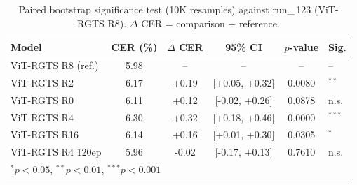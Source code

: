 \begin{table}[t]
\centering
\caption{Paired bootstrap significance test (10K resamples) against run\_{\,123} (ViT-RGTS R8). $\Delta$ CER = comparison $-$ reference.}
\label{tab:significance}
\begin{tabular}{lccccl}
\toprule
Model & CER (\%) & $\Delta$ CER & 95\% CI & $p$-value & Sig. \\
\midrule
ViT-RGTS R8 (ref.) & 5.98 & -- & -- & -- & -- \\
\midrule
ViT-RGTS R2 & 6.17 & +0.19 & [+0.05, +0.32] & 0.0080 & $^{**}$ \\
ViT-RGTS R0 & 6.11 & +0.12 & [-0.02, +0.26] & 0.0878 & n.s. \\
ViT-RGTS R4 & 6.30 & +0.32 & [+0.18, +0.46] & 0.0000 & $^{***}$ \\
ViT-RGTS R16 & 6.14 & +0.16 & [+0.01, +0.30] & 0.0305 & $^{*}$ \\
ViT-RGTS R4 120ep & 5.96 & -0.02 & [-0.17, +0.13] & 0.7610 & n.s. \\
\bottomrule
\multicolumn{6}{l}{\footnotesize $^{*}p<0.05$, $^{**}p<0.01$, $^{***}p<0.001$} \\
\end{tabular}
\end{table}
